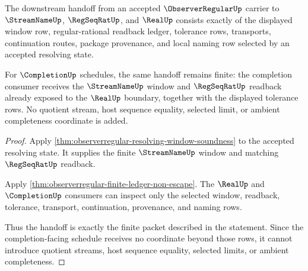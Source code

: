 \begin{theorem}
\label{thm:observerregular-streamname-handoff}
The downstream handoff from an accepted $\ObserverRegularUp$ carrier to $\StreamNameUp$, $\RegSeqRatUp$, and $\RealUp$ consists exactly of the displayed window row, regular-rational readback ledger, tolerance rows, transports, continuation routes, package provenance, and local naming row selected by an accepted resolving state.

For $\CompletionUp$ schedules, the same handoff remains finite: the completion consumer receives the $\StreamNameUp$ window and $\RegSeqRatUp$ readback already exposed to the $\RealUp$ boundary, together with the displayed tolerance rows. No quotient stream, host sequence equality, selected limit, or ambient completeness coordinate is added.
\end{theorem}
\begin{proof}
Apply \autoref{thm:observerregular-resolving-window-soundness} to the accepted resolving state. It supplies the finite $\StreamNameUp$ window and matching $\RegSeqRatUp$ readback.

Apply \autoref{thm:observerregular-finite-ledger-non-escape}. The $\RealUp$ and $\CompletionUp$ consumers can inspect only the selected window, readback, tolerance, transport, continuation, provenance, and naming rows.

Thus the handoff is exactly the finite packet described in the statement. Since the completion-facing schedule receives no coordinate beyond those rows, it cannot introduce quotient streams, host sequence equality, selected limits, or ambient completeness.
\end{proof}

